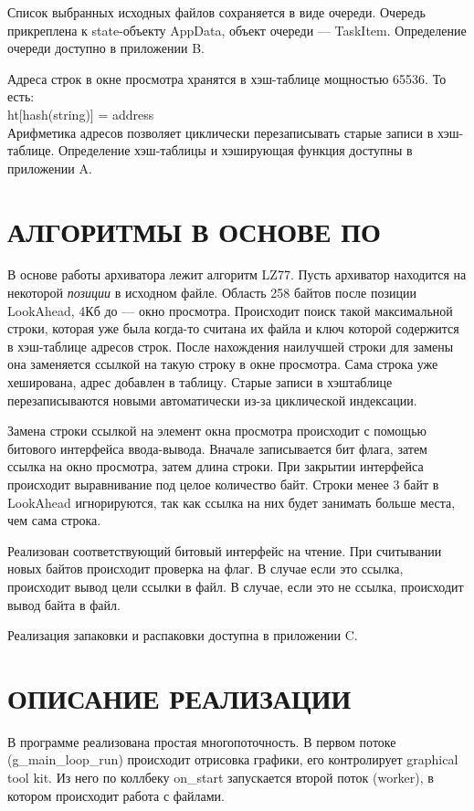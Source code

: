 \documentclass[a4paper,14pt]{extreport}
\begin{document}
Список выбранных исходных файлов сохраняется в виде очереди. Очередь
прикреплена к state-объекту AppData, объект очереди --- TaskItem. Определение
очереди доступно в приложении B.

Адреса строк в окне просмотра хранятся в хэш-таблице мощностью 65536. То
есть:\\
ht[hash(string)] = address\\
Арифметика адресов позволяет циклически перезаписывать старые записи в
хэш-таблице. Определение хэш-таблицы и хэширующая функция доступны в приложении
A.
\newpage
\chapter*{АЛГОРИТМЫ В ОСНОВЕ ПО}
В основе работы архиватора лежит алгоритм LZ77. Пусть архиватор находится на
некоторой \textit{позиции} в исходном файле. Область 258 байтов после позиции
LookAhead, 4Кб до --- окно просмотра. Происходит поиск такой максимальной
строки, которая уже была когда-то считана их файла и ключ которой содержится в
хэш-таблице адресов строк. После нахождения наилучшей строки для замены она
заменяется ссылкой на такую строку в окне просмотра. Сама строка уже
хеширована, адрес добавлен в таблицу. Старые записи в хэштаблице
перезаписываются новыми автоматически из-за циклической индексации.

Замена строки ссылкой на элемент окна просмотра происходит с помощью битового
интерфейса ввода-вывода. Вначале записывается бит флага, затем ссылка на окно
просмотра, затем длина строки. При закрытии интерфейса происходит выравнивание
под целое количество байт. Строки менее 3 байт в LookAhead игнорируются, так
как ссылка на них будет занимать больше места, чем сама строка.

Реализован соответствующий битовый интерфейс на чтение. При считывании новых
байтов происходит проверка на флаг. В случае если это ссылка, происходит вывод
цели ссылки в файл. В случае, если это не ссылка, происходит вывод байта в
файл.

Реализация запаковки и распаковки доступна в приложении C.

\newpage
\chapter*{ОПИСАНИЕ РЕАЛИЗАЦИИ}

В программе реализована простая многопоточность. В первом потоке
(g\_main\_loop\_run) происходит отрисовка графики, его контролирует graphical
tool kit. Из него по коллбеку on\_start запускается второй поток (worker), в
котором происходит работа с файлами.
\end{document}
